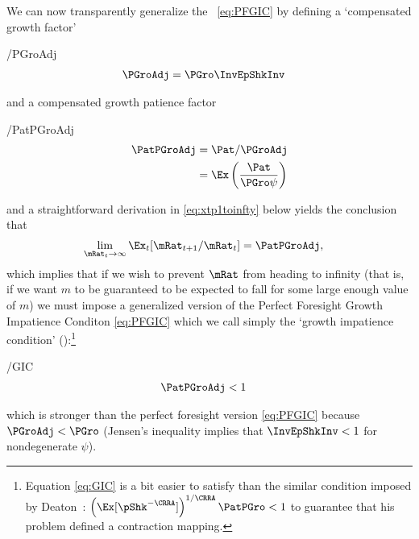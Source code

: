 \documentclass[./BufferStockTheory.tex]{subfiles}
\begin{document}
\hypertarget{GIC}{}
We can now transparently generalize the \PFGIC~\eqref{eq:PFGIC} by defining a `compensated growth factor' \hypertarget{PGroAdj}{}
\begin{verbatimwrite}{\EqDir/PGroAdj}
\begin{align}
  \PGroAdj  & =  \PGro \InvEpShkInv \label{eq:PGroAdj}
\end{align}
\end{verbatimwrite}

and a compensated growth patience factor\hypertarget{GIF}{}
\begin{verbatimwrite}{\EqDir/PatPGroAdj}
\begin{align}
  \PatPGroAdj  & = \Pat/\PGroAdj
  \\ & = \Ex\left(\frac{\Pat}{\PGro \psi}\right)
\end{align}
\end{verbatimwrite}

and a straightforward derivation in \eqref{eq:xtp1toinfty} below yields the conclusion that
\begin{align*}
  \lim_{\mRat_{t} \rightarrow \infty} \Ex_{t}[\mRat_{t+1}/\mRat_{t}]  & = \PatPGroAdj,
\end{align*}
which implies that if we wish to prevent $\mRat$ from heading to infinity (that is, if we want $m$ to be guaranteed to be expected to fall for some large enough value of $m$) we must impose a generalized version of the Perfect Foresight Growth Impatience Conditon \eqref{eq:PFGIC} which we call simply the `growth impatience condition' 
(\GIC):\footnote{Equation \eqref{eq:GIC} is a bit easier to satisfy than the similar condition imposed by Deaton~\citeyearpar{deatonLiqConstr}: $\left(\Ex[\pShk^{-\CRRA}]\right)^{1/\CRRA} \PatPGro < 1$ to guarantee that his problem defined a contraction mapping.}
\begin{verbatimwrite}{\EqDir/GIC}
\begin{align}
  \PatPGroAdj  & < 1 \label{eq:GIC}
\end{align}\end{verbatimwrite}

which is stronger than the perfect foresight version \eqref{eq:PFGIC} because $\PGroAdj < \PGro$ (Jensen's inequality implies that $\InvEpShkInv < 1$ for nondegenerate $\psi$).

\hypertarget{Autarky-Value}{}
\end{document}

